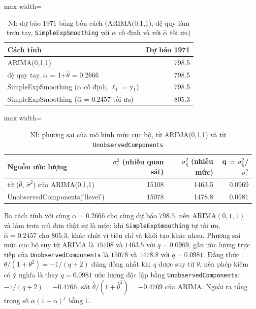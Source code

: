 \begin{table}[H]
\centering\footnotesize
\caption{NI: dự báo 1971 bằng bốn cách (ARIMA(0,1,1), đệ quy làm trơn tay, \texttt{SimpleExpSmoothing} với $\alpha$ cố định và với $\hat\alpha$ tối ưu)}\label{tab:tab_b12_07_ses_forecasts}
\begin{adjustbox}{max width=\linewidth}
\begin{tabular}{|>{\raggedright\arraybackslash}p{}|r|}
\toprule
Cách tính & Dự báo 1971 \\
\midrule
ARIMA(0,1,1) & 798.5 \\[3pt]
đệ quy tay, $\alpha$ = 1+$\hat{\theta}$ = 0.2666 & 798.5 \\[3pt]
SimpleExpSmoothing ($\alpha$ cố định, $\ell_{1}$ = y$_{1}$) & 798.5 \\[3pt]
SimpleExpSmoothing ($\hat{\alpha}$ = 0.2457 tối ưu) & 805.3 \\[3pt]
\bottomrule
\end{tabular}
\end{adjustbox}
\end{table}
\begin{table}[H]
\centering\footnotesize
\caption{NI: phương sai của mô hình mức cục bộ, từ ARIMA(0,1,1) và từ \texttt{UnobservedComponents}}\label{tab:tab_b12_07_local_level}
\begin{adjustbox}{max width=\linewidth}
\begin{tabular}{|>{\raggedright\arraybackslash}p{}|r|r|r|}
\toprule
Nguồn ước lượng & $\sigma^{2}_{\varepsilon}$ (nhiễu quan sát) & $\sigma^{2}_{\eta}$ (nhiễu mức) & q = $\sigma^{2}_{\eta}$/$\sigma^{2}_{\varepsilon}$ \\
\midrule
từ ($\hat{\theta}$, $\hat{\sigma}^{2}$) của ARIMA(0,1,1) & 15108 & 1463.5 & 0.0969 \\[3pt]
UnobservedComponents('llevel') & 15078 & 1478.8 & 0.0981 \\[3pt]
\bottomrule
\end{tabular}
\end{adjustbox}
\end{table}
 Ba cách tính với cùng $\alpha=0.2666$ cho cùng dự báo $798.5$, nên ARIMA$(0,1,1)$ và làm trơn mũ đơn thật sự là một; khi \texttt{SimpleExpSmoothing} tự tối ưu, $\hat\alpha=0.2457$ cho $805.3$, khác chút vì tiêu chí và khởi tạo khác nhau. Phương sai mức cục bộ suy từ ARIMA là $15108$ và $1463.5$ với $q=0.0969$, gần ước lượng trực tiếp của \texttt{UnobservedComponents} là $15078$ và $1478.8$ với $q=0.0981$. Đẳng thức $\theta/(1+\theta^2)=-1/(q+2)$ đúng đồng nhất khi $q$ được suy từ $\theta$, nên phép kiểm có ý nghĩa là thay $q=0.0981$ ước lượng độc lập bằng \texttt{UnobservedComponents}: $-1/(q+2)=-0.4766$, sát $\hat\theta/(1+\hat\theta^2)=-0.4769$ của ARIMA. Ngoài ra tổng trọng số $\alpha(1-\alpha)^j$ bằng $1$.

